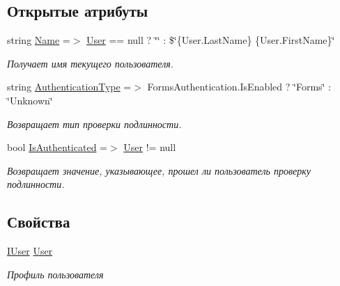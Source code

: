 \subsection*{Открытые атрибуты}
\begin{DoxyCompactItemize}
\item 
string \hyperlink{class_security_1_1_web_1_1_user_identity_a432b449be24dbfb4d8495bf15d6ac1e8}{Name} =$>$ \hyperlink{class_security_1_1_web_1_1_user_identity_a0569265b4eb6d169cd2271600e642fcf}{User} == null ? \char`\"{}\char`\"{} \+: \$\char`\"{}\{User.\+Last\+Name\} \{User.\+First\+Name\}\char`\"{}
\begin{DoxyCompactList}\small\item\em Получает имя текущего пользователя. \end{DoxyCompactList}\item 
string \hyperlink{class_security_1_1_web_1_1_user_identity_a7cf0a542015f4dc80e657662d605c7ad}{Authentication\+Type} =$>$ Forms\+Authentication.\+Is\+Enabled ? \char`\"{}Forms\char`\"{} \+: \char`\"{}Unknown\char`\"{}
\begin{DoxyCompactList}\small\item\em Возвращает тип проверки подлинности. \end{DoxyCompactList}\item 
bool \hyperlink{class_security_1_1_web_1_1_user_identity_a65b6fa7f0c23c0aeac354cb36e19da0c}{Is\+Authenticated} =$>$ \hyperlink{class_security_1_1_web_1_1_user_identity_a0569265b4eb6d169cd2271600e642fcf}{User} != null
\begin{DoxyCompactList}\small\item\em Возвращает значение, указывающее, прошел ли пользователь проверку подлинности. \end{DoxyCompactList}\end{DoxyCompactItemize}
\subsection*{Свойства}
\begin{DoxyCompactItemize}
\item 
\hyperlink{interface_security_1_1_interfaces_1_1_model_1_1_i_user}{I\+User} \hyperlink{class_security_1_1_web_1_1_user_identity_a0569265b4eb6d169cd2271600e642fcf}{User}
\begin{DoxyCompactList}\small\item\em Профиль пользователя \end{DoxyCompactList}\end{DoxyCompactItemize}


